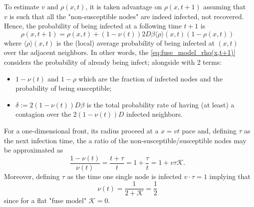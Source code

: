 \documentclass[a4paper,10pt, oneside]{book} %
\theoremstyle{definition}
\begin{document}
To estimate $v \text{ and } \rho(x,t)$, it is taken advantage on $\rho(x,t+1)$ assuming that $v$ is such that all the "non-susceptible nodes" are indeed infected, not recovered. Hence, the probability of being infected at a following time $t+1$ is
\begin{equation}
	\rho(x, t+1) = \rho(x,t)+(1-\nu(t))2D \beta \langle \rho \rangle(x,t) (1-\rho(x,t))
	\label{eq:fuse_model_rho(x,t+1)}
\end{equation}  
where $\langle \rho \rangle(x,t)$ is the (local) average probability of being infected at $(x,t)$ over the adjacent neighbors.
In other words, the \autoref{eq:fuse_model_rho(x,t+1)} considers the probability of already being infect; alongside with 2 terms:
\begin{itemize}
	\item $1-\nu(t)$ and $1-\rho$ which are the fraction of infected nodes and the probability of being susceptible;
	\item $\delta:= 2(1-\nu(t))D \beta$ is the total probability rate of having (at least) a contagion over the $2(1-\nu(t))D$ infected neighbors.
\end{itemize}
For a one-dimensional front, its radius proceed at a $x=vt$ pace and, defining $\tau$ as the next infection time, the a ratio of the non-susceptible/susceptible nodes may be approximated as 
\begin{equation*}
	\frac{1-\nu(t)}{\nu(t)} = \frac{t+\tau}{t} = 1+\frac{\tau}{t} = 1+v \tau \mathcal{K}.
\end{equation*}
Moreover, defining $\tau$ as the time one single node is infected $v \cdot \tau = 1$ implying that 
\[ \nu(t) = \frac{1}{2+\mathcal{K}} = \frac{1}{2} \]
since for a flat "fuse model" $\mathcal{K} = 0$.

\noindent{}
\end{document}
